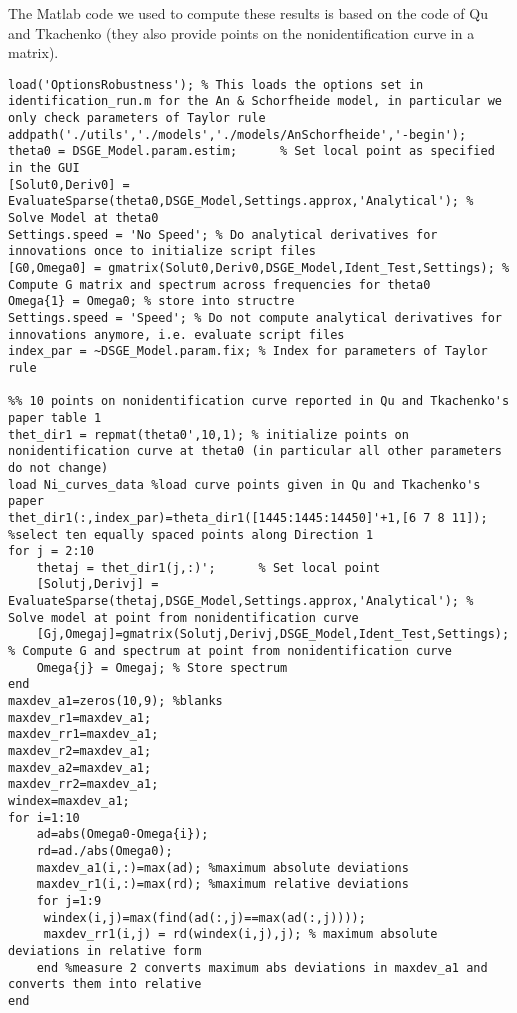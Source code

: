 \documentclass{article}
\begin{document}
The Matlab code we used to compute these results is based on the code of Qu and Tkachenko (they also provide points on the nonidentification curve in a matrix).
\begin{verbatim}
load('OptionsRobustness'); % This loads the options set in identification_run.m for the An & Schorfheide model, in particular we only check parameters of Taylor rule
addpath('./utils','./models','./models/AnSchorfheide','-begin');
theta0 = DSGE_Model.param.estim;      % Set local point as specified in the GUI
[Solut0,Deriv0] = EvaluateSparse(theta0,DSGE_Model,Settings.approx,'Analytical'); % Solve Model at theta0
Settings.speed = 'No Speed'; % Do analytical derivatives for innovations once to initialize script files
[G0,Omega0] = gmatrix(Solut0,Deriv0,DSGE_Model,Ident_Test,Settings); % Compute G matrix and spectrum across frequencies for theta0
Omega{1} = Omega0; % store into structre
Settings.speed = 'Speed'; % Do not compute analytical derivatives for innovations anymore, i.e. evaluate script files
index_par = ~DSGE_Model.param.fix; % Index for parameters of Taylor rule

%% 10 points on nonidentification curve reported in Qu and Tkachenko's paper table 1
thet_dir1 = repmat(theta0',10,1); % initialize points on nonidentification curve at theta0 (in particular all other parameters do not change)
load Ni_curves_data %load curve points given in Qu and Tkachenko's paper
thet_dir1(:,index_par)=theta_dir1([1445:1445:14450]'+1,[6 7 8 11]); %select ten equally spaced points along Direction 1
for j = 2:10
    thetaj = thet_dir1(j,:)';      % Set local point
    [Solutj,Derivj] = EvaluateSparse(thetaj,DSGE_Model,Settings.approx,'Analytical'); % Solve model at point from nonidentification curve
    [Gj,Omegaj]=gmatrix(Solutj,Derivj,DSGE_Model,Ident_Test,Settings); % Compute G and spectrum at point from nonidentification curve
    Omega{j} = Omegaj; % Store spectrum
end
maxdev_a1=zeros(10,9); %blanks
maxdev_r1=maxdev_a1;
maxdev_rr1=maxdev_a1;
maxdev_r2=maxdev_a1;
maxdev_a2=maxdev_a1;
maxdev_rr2=maxdev_a1;
windex=maxdev_a1;
for i=1:10
    ad=abs(Omega0-Omega{i});
    rd=ad./abs(Omega0);
    maxdev_a1(i,:)=max(ad); %maximum absolute deviations
    maxdev_r1(i,:)=max(rd); %maximum relative deviations
    for j=1:9
     windex(i,j)=max(find(ad(:,j)==max(ad(:,j))));
     maxdev_rr1(i,j) = rd(windex(i,j),j); % maximum absolute deviations in relative form
    end %measure 2 converts maximum abs deviations in maxdev_a1 and converts them into relative
end


\end{verbatim}
\end{document}
